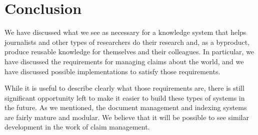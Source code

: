 \documentclass[format=siggraph, review=true]{acmart}
\begin{document}
\section{Conclusion}
We have discussed what we see as necessary for a knowledge system that
helps journalists and other types of researchers do their research
and, as a byproduct, produce reusable knowledge for themselves and
their colleagues. In particular, we have discussed the requirements
for managing claims about the world, and we have discussed possible
implementations to satisfy those requirements.

While it is useful to describe clearly what those requirements are,
there is still significant opportunity left to make it easier to build
these types of systems in the future. As we mentioned, the document
management and indexing systems are fairly mature and modular. We
believe that it will be possible to see similar development in the
work of claim management. 










\end{document}

